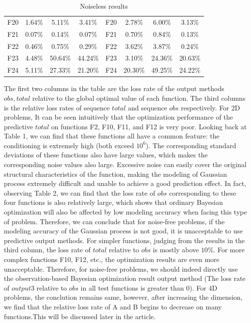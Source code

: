 \documentclass{article}
\begin{document}
\begin{table}[!ht]
{\begin{tabular}{|c|ccc|c|ccc|}
		\cline{1-8}
        F20 & 1.64\% & 5.11\% & 3.41\% & F20 & 2.78\% & 6.00\% & 3.13\% \\ 
        F21 & 0.07\% & 0.14\% & 0.07\% & F21 & 0.70\% & 0.84\% & 0.13\% \\ 
        F22 & 0.46\% & 0.75\% & 0.29\% & F22 & 3.62\% & 3.87\% & 0.24\% \\ 
        F23 & 4.48\% & 50.64\% & 44.24\% & F23 & 3.10\% & 24.36\% & 20.63\% \\ 
        F24 & 5.11\% & 27.33\% & 21.20\% & F24 & 20.30\% & 49.25\% & 24.22\% \\ \hline
    \end{tabular}
	}
	\caption{Noiseless results}
\end{table}

 
  \hspace{2em}The first two columns in the table are the loss rate of the output methods $obs, total$ relative to the global optimal value of each function. The third columns is the relative loss rates of sequence $total$ and sequence $obs$ respectively. For 2D problems, It can be seen intuitively that the optimization performance of the predictive $total$ on functions F2, F10, F11, and F12 is very poor. Looking back at Table 1, we can find that these functions all have a common feature: the conditioning is extremely high (both exceed $10^6$). The corresponding standard deviations of these functions also have large values, which makes the corresponding noise values also large. Excessive noise can easily cover the original structural characteristics of the function, making the modeling of Gaussian process extremely difficult and unable to achieve a good prediction effect. In fact, observing Table 2, we can find that the loss rate of $obs$ corresponding to these four functions is also relatively large, which shows that ordinary Bayesian optimization will also be affected by low modeling accuracy when facing this type of problem. Therefore, we can conclude that for noise-free problems, if the modeling accuracy of the Gaussian process is not good, it is unacceptable to use predictive output methods. For simpler functions, judging from the results in the third column, the loss rate of $total$ relative to $obs$ is mostly above $10\%$. For more complex functions F10, F12, etc., the optimization results are even more unacceptable. Therefore, for noise-free problems, we should indeed directly use the observation-based Bayesian optimization result output method (The loss rate of $output3$ relative to $obs$ in all test functions is greater than 0). For 4D problems, the conclution remains same, however, after increasing the dimension, we find that the relative loss rate of A and B begins to decrease on many functions.This will be discussed later in the article.
\end{document}
